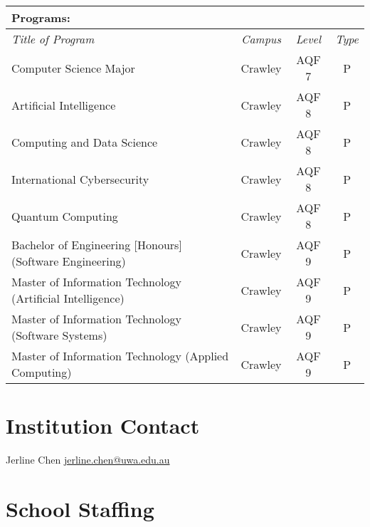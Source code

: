 \begin{table}[h]
\begin{tabular}{| l | c | c | c |}\hline
\multicolumn{4}{|l|}{\large\bf\cellcolor{colorDarkBlue} Programs:} \\ \hline
{\it\cellcolor{colorDarkBlue} Title of Program}  & 
{\it\cellcolor{colorDarkBlue} Campus}  & 
{\it\cellcolor{colorDarkBlue} Level} & 
{\it\cellcolor{colorDarkBlue} Type} \\ \hline
Computer Science Major                       & Crawley & AQF 7 & P    \\ \hline
Artificial Intelligence                                    & Crawley & AQF 8 & P    \\ \hline
Computing and Data Science                                 & Crawley & AQF 8 & P    \\ \hline
International Cybersecurity                                & Crawley & AQF 8 & P    \\ \hline
Quantum Computing                                          & Crawley & AQF 8 & P    \\ \hline
Bachelor of Engineering [Honours] (Software Engineering)                                    & Crawley & AQF 9 & P    \\ \hline
Master of Information Technology (Artificial Intelligence) & Crawley & AQF 9 & P    \\ \hline
Master of Information Technology (Software Systems)        & Crawley & AQF 9 & P    \\ \hline
Master of Information Technology (Applied Computing)       & Crawley & AQF 9 & P   \\ \hline
\end{tabular}
\end{table}


\section{Institution Contact}

 Jerline Chen \url{jerline.chen@uwa.edu.au}


\section{School Staffing}

